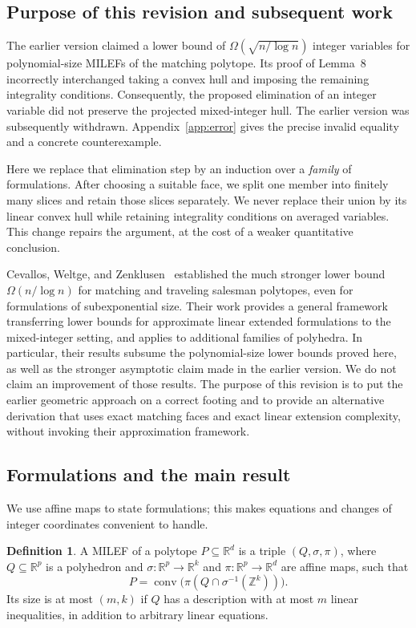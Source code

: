 \documentclass[11pt]{article}
\theoremstyle{definition}
\newtheorem{definition}[theorem]{Definition}
\DeclareMathOperator{\conv}{conv}
\newcommand{\R}{\mathbb R}
\newcommand{\Z}{\mathbb Z}
\begin{document}
\subsection{Purpose of this revision and subsequent work}
The earlier version claimed a lower bound of
$\Omega(\sqrt{n/\log n})$ integer variables for polynomial-size MILEFs of
the matching polytope. Its proof of Lemma~8 incorrectly interchanged taking
a convex hull and imposing the remaining integrality conditions. Consequently,
the proposed elimination of an integer variable did not preserve the projected
mixed-integer hull. The earlier version was subsequently withdrawn.
Appendix~\ref{app:error} gives the precise invalid equality and a concrete
counterexample.

Here we replace that elimination step by an induction over a \emph{family}
of formulations. After choosing a suitable face, we split one member into
finitely many slices and retain those slices separately. We never replace
their union by its linear convex hull while retaining integrality conditions
on averaged variables. This change repairs the argument, at the cost of a
weaker quantitative conclusion.

Cevallos, Weltge, and Zenklusen~\cite{CWZ2018} established the much stronger
lower bound $\Omega(n/\log n)$ for matching and traveling salesman polytopes,
even for formulations of subexponential size. Their work provides a general
framework transferring lower bounds for approximate linear extended formulations
to the mixed-integer setting, and applies to additional families of polyhedra.
In particular, their results subsume the polynomial-size lower bounds proved
here, as well as the stronger asymptotic claim made in the earlier version.
We do not claim an improvement of those results. The purpose of this revision
is to put the earlier geometric approach on a correct footing and to provide
an alternative derivation that uses exact matching faces and exact linear
extension complexity, without invoking their approximation framework.

\subsection{Formulations and the main result}
We use affine maps to state formulations; this makes equations and changes of
integer coordinates convenient to handle.

\begin{definition}
A MILEF of a polytope $P\subseteq\R^d$ is a triple $(Q,\sigma,\pi)$, where
$Q\subseteq\R^p$ is a polyhedron and $\sigma:\R^p\to\R^k$ and
$\pi:\R^p\to\R^d$ are affine maps, such that
\begin{equation}\label{eq:milef}
 P=\conv\bigl(\pi(Q\cap\sigma^{-1}(\Z^k))\bigr).
\end{equation}
Its size is at most $(m,k)$ if $Q$ has a description with at most $m$
linear inequalities, in addition to arbitrary linear equations.
\end{definition}
\end{document}
